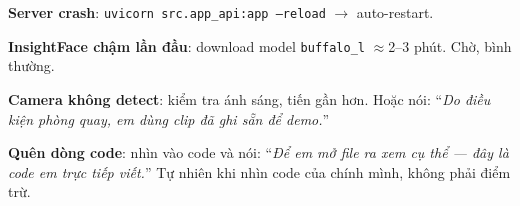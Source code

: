 \documentclass[12pt, a4paper]{article}
\begin{document}
\begin{tcolorbox}[colback=red!5, colframe=red!60,
  title={\textbf{Xử lý sự cố}}]
\textbf{Server crash}: \texttt{uvicorn src.app\_api:app --reload} $\to$ auto-restart.

\textbf{InsightFace chậm lần đầu}: download model \texttt{buffalo\_l} $\approx$2--3 phút. Chờ, bình thường.

\textbf{Camera không detect}: kiểm tra ánh sáng, tiến gần hơn. Hoặc nói:
``\textit{Do điều kiện phòng quay, em dùng clip đã ghi sẵn để demo.}''

\textbf{Quên dòng code}: nhìn vào code và nói:
``\textit{Để em mở file ra xem cụ thể --- đây là code em trực tiếp viết.}''
Tự nhiên khi nhìn code của chính mình, không phải điểm trừ.
\end{tcolorbox}
\end{document}
